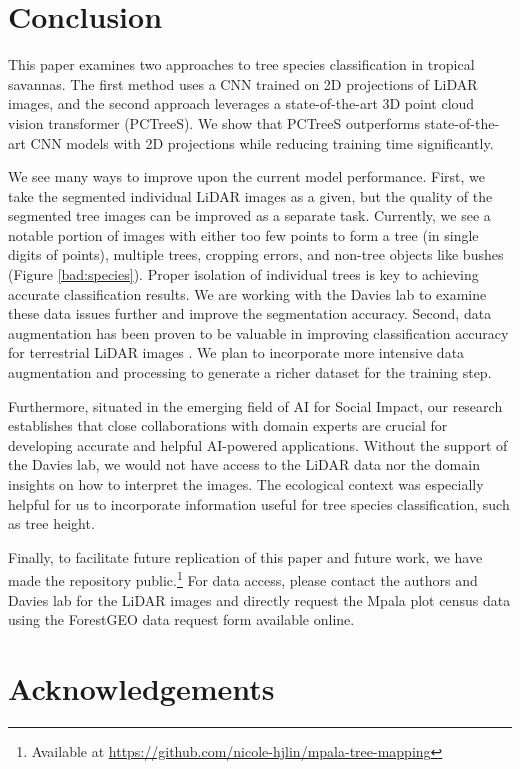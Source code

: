 \documentclass[letterpaper]{article} %
\begin{document}
\section{Conclusion}

This paper examines two approaches to tree species classification in tropical savannas. The first method uses a CNN trained on 2D projections of LiDAR images, and the second approach leverages a state-of-the-art 3D point cloud vision transformer (PCTreeS). We show that PCTreeS outperforms state-of-the-art CNN models with 2D projections while reducing training time significantly.

We see many ways to improve upon the current model performance. First, we take the segmented individual LiDAR images as a given, but the quality of the segmented tree images can be improved as a separate task. Currently, we see a notable portion of images with either too few points to form a tree (in single digits of points), multiple trees, cropping errors, and non-tree objects like bushes (Figure \ref{bad:species}). Proper isolation of individual trees is key to achieving accurate classification results. We are working with the Davies lab to examine these data issues further and improve the segmentation accuracy. Second, data augmentation has been proven to be valuable in improving classification accuracy for terrestrial LiDAR images \cite{allen}. We plan to incorporate more intensive data augmentation and processing to generate a richer dataset for the training step.

Furthermore, situated in the emerging field of AI for Social Impact, our research establishes that close collaborations with domain experts are crucial for developing accurate and helpful AI-powered applications. Without the support of the Davies lab, we would not have access to the LiDAR data nor the domain insights on how to interpret the images. The ecological context was especially helpful for us to incorporate information useful for tree species classification, such as tree height. 

Finally, to facilitate future replication of this paper and future work, we have made the repository public.\footnote{Available at \url{https://github.com/nicole-hjlin/mpala-tree-mapping}} For data access, please contact the authors and Davies lab for the LiDAR images and directly request the Mpala plot census data using the ForestGEO data request form available online. 

\section{Acknowledgements}
\end{document}
